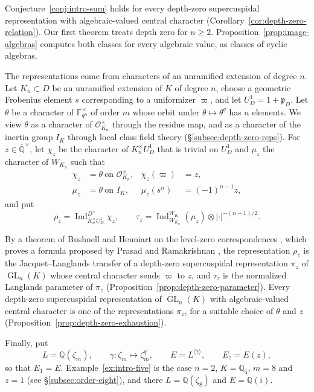 \documentclass[a4paper,11pt]{amsart}
\theoremstyle{definition}
\theoremstyle{remark}
\numberwithin{equation}{section}
\newcommand{\Q}{\mathbb{Q}}
\DeclareMathOperator{\GL}{GL}
\newcommand{\F}{\mathbb{F}}
\newcommand{\Qbar}{\overline{\mathbb{Q}}}
\newcommand{\OO}{\mathcal{O}}
\DeclareMathOperator{\Ind}{Ind}
\begin{document}
Conjecture~\ref{conj:intro-sum} holds for every depth-zero supercuspidal representation with algebraic-valued central character (Corollary~\ref{cor:depth-zero-relation}). Our first theorem treats depth zero for $n\ge2$. Proposition~\ref{prop:image-algebras} computes both classes for every algebraic value, as classes of cyclic algebras.

The representations come from characters of an unramified extension of degree $n$. Let $K_n\subset D$ be an unramified extension of $K$ of degree $n$, choose a geometric Frobenius element $s$ corresponding to a uniformizer $\varpi$, and let $U^1_D=1+\mathfrak p_D$. Let $\theta$ be a character of $\F_{q^n}^\times$ of order $m$ whose orbit under $\theta\mapsto\theta^q$ has $n$ elements. We view $\theta$ as a character of $\OO_{K_n}^\times$ through the residue map, and as a character of the inertia group $I_K$ through local class field theory (\S\ref{subsec:depth-zero-reps}). For $z\in\Qbar^\times$, let $\chi_z$ be the character of $K_n^\times U^1_D$ that is trivial on $U^1_D$ and $\mu_z$ the character of $W_{K_n}$ such that
\[
\begin{aligned}
 \chi_z&=\theta\ \text{on }\OO_{K_n}^\times, & \chi_z(\varpi)&=z,\\
 \mu_z&=\theta\ \text{on }I_K, & \mu_z(s^n)&=(-1)^{n-1}z,
\end{aligned}
\]
and put
\[
 \rho_z=\Ind_{K_n^\times U^1_D}^{D^\times}\chi_z,\qquad \tau_z=\Ind_{W_{K_n}}^{W_K}(\mu_z)\otimes|\cdot|^{-(n-1)/2}.
\]

By a theorem of Bushnell and Henniart on the level-zero correspondences \cite[6.3, Corollary~1]{BH11L}, which proves a formula proposed by Prasad and Ramakrishnan \cite[Theorem~4.4]{PR12}, the representation $\rho_z$ is the Jacquet--Langlands transfer of a depth-zero supercuspidal representation $\pi_z$ of $\GL_n(K)$ whose central character sends $\varpi$ to $z$, and $\tau_z$ is the normalized Langlands parameter of $\pi_z$ (Proposition~\ref{prop:depth-zero-parameter}). Every depth-zero supercuspidal representation of $\GL_n(K)$ with algebraic-valued central character is one of the representations $\pi_z$, for a suitable choice of $\theta$ and $z$ (Proposition~\ref{prop:depth-zero-exhaustion}).

Finally, put
\[
 L=\Q(\zeta_m),\qquad \gamma\colon\zeta_m\mapsto\zeta_m^q,\qquad E=L^{\langle\gamma\rangle},\qquad E_z=E(z),
\]
so that $E_1=E$. Example~\ref{ex:intro-five} is the case $n=2$, $K=\Q_5$, $m=8$ and $z=1$ (see \S\ref{subsec:order-eight}), and there $L=\Q(\zeta_8)$ and $E=\Q(i)$.
\end{document}
